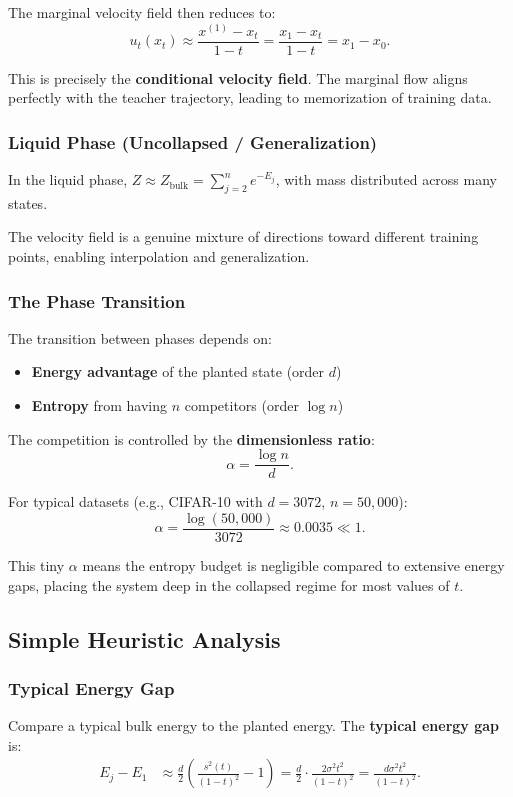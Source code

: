 \documentclass[11pt]{article}
\begin{document}
The marginal velocity field then reduces to:
\begin{equation}
u_t(x_t) \approx \frac{x^{(1)} - x_t}{1-t} = \frac{x_1 - x_t}{1-t} = x_1 - x_0.
\end{equation}

This is precisely the \textbf{conditional velocity field}. The marginal flow aligns perfectly with the teacher trajectory, leading to memorization of training data.

\subsubsection{Liquid Phase (Uncollapsed / Generalization)}
In the liquid phase, $Z \approx Z_{\text{bulk}} = \sum_{j=2}^n e^{-E_j}$, with mass distributed across many states.

The velocity field is a genuine mixture of directions toward different training points, enabling interpolation and generalization.

\subsubsection{The Phase Transition}
The transition between phases depends on:
\begin{itemize}
\item \textbf{Energy advantage} of the planted state (order $d$)
\item \textbf{Entropy} from having $n$ competitors (order $\log n$)
\end{itemize}

The competition is controlled by the \textbf{dimensionless ratio}:
\begin{equation}
\alpha = \frac{\log n}{d}.
\end{equation}

For typical datasets (e.g., CIFAR-10 with $d = 3072$, $n = 50{,}000$):
\begin{equation}
\alpha = \frac{\log(50{,}000)}{3072} \approx 0.0035 \ll 1.
\end{equation}

This tiny $\alpha$ means the entropy budget is negligible compared to extensive energy gaps, placing the system deep in the collapsed regime for most values of $t$.

\subsection{Simple Heuristic Analysis}
\subsubsection{Typical Energy Gap}
Compare a typical bulk energy to the planted energy. The \textbf{typical energy gap} is:
\begin{align}
E_j - E_1
&\approx \frac{d}{2}\left(\frac{s^2(t)}{(1-t)^2}-1\right)
= \frac{d}{2}\cdot \frac{2\sigma^2 t^2}{(1-t)^2}
= \frac{d\sigma^2 t^2}{(1-t)^2}.
\end{align}
\end{document}
